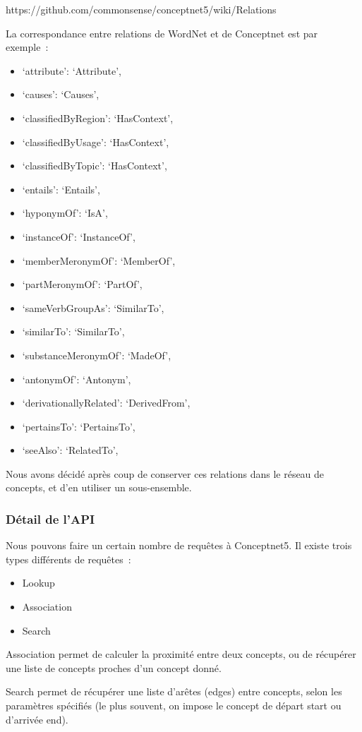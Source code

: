 \documentclass[a4paper,12pt]{article}
\begin{document}
https://github.com/commonsense/conceptnet5/wiki/Relations

La correspondance entre relations de WordNet et de Conceptnet est par exemple~:
\begin{itemize}
 \item `attribute': `Attribute',
 \item `causes': `Causes',
 \item `classifiedByRegion': `HasContext',
 \item `classifiedByUsage': `HasContext',
 \item `classifiedByTopic': `HasContext',
 \item `entails': `Entails',
 \item `hyponymOf': `IsA',
 \item `instanceOf': `InstanceOf',
 \item `memberMeronymOf': `MemberOf',
 \item `partMeronymOf': `PartOf',
 \item `sameVerbGroupAs': `SimilarTo',
 \item `similarTo': `SimilarTo',
 \item `substanceMeronymOf': `MadeOf',
 \item `antonymOf': `Antonym',
 \item `derivationallyRelated': `DerivedFrom',
 \item `pertainsTo': `PertainsTo',
 \item `seeAlso': `RelatedTo',
\end{itemize}

Nous avons décidé après coup de conserver ces relations dans le réseau de concepts, et d'en utiliser un sous-ensemble.

\subsubsection{Détail de l'API}

Nous pouvons faire un certain nombre de requêtes à Conceptnet5. Il existe trois types différents de requêtes~:
\begin{itemize}
 \item Lookup
 \item Association
 \item Search
\end{itemize}
Association permet de calculer la proximité entre deux concepts, ou de récupérer une liste de concepts proches d'un concept donné.

Search permet de récupérer une liste d'arêtes (edges) entre concepts, selon les paramètres spécifiés (le plus souvent, on impose le concept de départ start ou d'arrivée end). 
\end{document}
